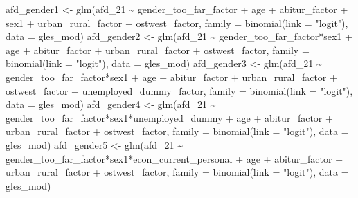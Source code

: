 \documentclass[
]{article}
\newenvironment{Shaded}{\begin{snugshade}}{\end{snugshade}}
\newcommand{\AttributeTok}[1]{\textcolor[rgb]{0.77,0.63,0.00}{#1}}
\newcommand{\FunctionTok}[1]{\textcolor[rgb]{0.00,0.00,0.00}{#1}}
\newcommand{\NormalTok}[1]{#1}
\newcommand{\OtherTok}[1]{\textcolor[rgb]{0.56,0.35,0.01}{#1}}
\newcommand{\SpecialCharTok}[1]{\textcolor[rgb]{0.00,0.00,0.00}{#1}}
\newcommand{\StringTok}[1]{\textcolor[rgb]{0.31,0.60,0.02}{#1}}
\begin{document}
\begin{Shaded}
\begin{Highlighting}[]
\NormalTok{afd\_gender1 }\OtherTok{\textless{}{-}} \FunctionTok{glm}\NormalTok{(afd\_21 }\SpecialCharTok{\textasciitilde{}}\NormalTok{ gender\_too\_far\_factor }\SpecialCharTok{+}\NormalTok{ age }\SpecialCharTok{+}\NormalTok{ abitur\_factor }\SpecialCharTok{+}\NormalTok{ sex1 }\SpecialCharTok{+}\NormalTok{ urban\_rural\_factor }\SpecialCharTok{+}\NormalTok{ ostwest\_factor, }
                  \AttributeTok{family =} \FunctionTok{binomial}\NormalTok{(}\AttributeTok{link =} \StringTok{"logit"}\NormalTok{), }
                  \AttributeTok{data =}\NormalTok{ gles\_mod)}
\NormalTok{afd\_gender2 }\OtherTok{\textless{}{-}} \FunctionTok{glm}\NormalTok{(afd\_21 }\SpecialCharTok{\textasciitilde{}}\NormalTok{ gender\_too\_far\_factor}\SpecialCharTok{*}\NormalTok{sex1 }\SpecialCharTok{+}\NormalTok{ age }\SpecialCharTok{+}\NormalTok{ abitur\_factor }\SpecialCharTok{+}\NormalTok{  urban\_rural\_factor }\SpecialCharTok{+}\NormalTok{ ostwest\_factor, }
                  \AttributeTok{family =} \FunctionTok{binomial}\NormalTok{(}\AttributeTok{link =} \StringTok{"logit"}\NormalTok{), }
                  \AttributeTok{data =}\NormalTok{ gles\_mod)}
\NormalTok{afd\_gender3 }\OtherTok{\textless{}{-}} \FunctionTok{glm}\NormalTok{(afd\_21 }\SpecialCharTok{\textasciitilde{}}\NormalTok{ gender\_too\_far\_factor}\SpecialCharTok{*}\NormalTok{sex1 }\SpecialCharTok{+}\NormalTok{ age }\SpecialCharTok{+}\NormalTok{ abitur\_factor }\SpecialCharTok{+}\NormalTok{  urban\_rural\_factor }\SpecialCharTok{+}\NormalTok{ ostwest\_factor }\SpecialCharTok{+}\NormalTok{ unemployed\_dummy\_factor, }
                  \AttributeTok{family =} \FunctionTok{binomial}\NormalTok{(}\AttributeTok{link =} \StringTok{"logit"}\NormalTok{), }
                  \AttributeTok{data =}\NormalTok{ gles\_mod)}
\NormalTok{afd\_gender4 }\OtherTok{\textless{}{-}} \FunctionTok{glm}\NormalTok{(afd\_21 }\SpecialCharTok{\textasciitilde{}}\NormalTok{ gender\_too\_far\_factor}\SpecialCharTok{*}\NormalTok{sex1}\SpecialCharTok{*}\NormalTok{unemployed\_dummy }\SpecialCharTok{+}\NormalTok{ age }\SpecialCharTok{+}\NormalTok{ abitur\_factor }\SpecialCharTok{+}\NormalTok{  urban\_rural\_factor }\SpecialCharTok{+}\NormalTok{ ostwest\_factor, }
                  \AttributeTok{family =} \FunctionTok{binomial}\NormalTok{(}\AttributeTok{link =} \StringTok{"logit"}\NormalTok{), }
                  \AttributeTok{data =}\NormalTok{ gles\_mod)}
\NormalTok{afd\_gender5 }\OtherTok{\textless{}{-}} \FunctionTok{glm}\NormalTok{(afd\_21 }\SpecialCharTok{\textasciitilde{}}\NormalTok{ gender\_too\_far\_factor}\SpecialCharTok{*}\NormalTok{sex1}\SpecialCharTok{*}\NormalTok{econ\_current\_personal }\SpecialCharTok{+}\NormalTok{ age }\SpecialCharTok{+}\NormalTok{ abitur\_factor }\SpecialCharTok{+}\NormalTok{  urban\_rural\_factor }\SpecialCharTok{+}\NormalTok{ ostwest\_factor, }
                  \AttributeTok{family =} \FunctionTok{binomial}\NormalTok{(}\AttributeTok{link =} \StringTok{"logit"}\NormalTok{), }
                  \AttributeTok{data =}\NormalTok{ gles\_mod)}


\end{Highlighting}
\end{Shaded}
\end{document}
